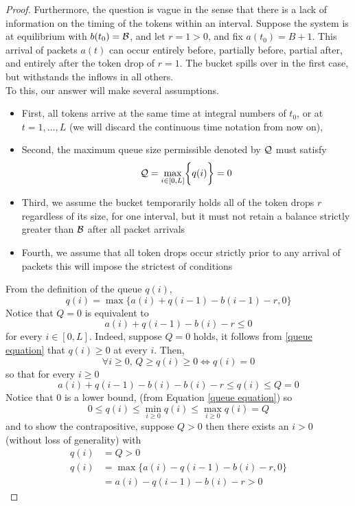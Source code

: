 \documentclass[../../main.tex]{subfiles}
\begin{document}
\begin{proof}
    Furthermore, the question is vague in the sense that there is a lack of information on the timing of the tokens within an interval. Suppose the system is at equilibrium with $b(t_0)=\mathcal{B}$, and let $r=1>0$, and fix $a(t_0)=B+1$. This arrival of packets $a(t)$ can occur entirely before, partially before, partial after, and entirely after the token drop of $r=1$. The bucket spills over in the first case, but withstands the inflows in all others.\\
    
    To this, our answer will make several assumptions.
    \begin{itemize}
        \item First, all tokens arrive at the same time at integral numbers of $t_0$, or at $t=1,\ldots, L$ (we will discard the continuous time notation from now on),
        \item Second, the maximum queue size permissible denoted by $\mathcal{Q}$ must satisfy
        \[\mathcal{Q} = \max_{i\in[0,L]}\biggl\{q(i)\biggr\}=0\]
        \item Third, we assume the bucket temporarily holds all of the token drops $r$ regardless of its size, for one interval, but it must not retain a balance strictly greater than $\mathcal{B}$ after all packet arrivals
        \item Fourth, we assume that all token drops occur strictly prior to any arrival of packets this will impose the strictest of conditions
    \end{itemize}
    From the definition of the queue $q(i)$,
    \begin{equation}\label{queue equation}
        q(i)=\max\biggl\{a(i)+q(i-1)-b(i-1)-r,0\biggr\}
    \end{equation}
    Notice that $Q=0$ is equivalent to \[a(i)+q(i-1)-b(i)-r\leq 0\]
    for every $i\in[0,L]$. Indeed, suppose $Q=0$ holds, it follows from \eqref{queue equation} that $q(i)\geq 0$ at every $i$. Then,
    \[\forall i\geq 0,\,Q\geq q(i)\geq 0\iff q(i)=0\]
    so that for every $i\geq 0$\[a(i)+q(i-1)-b(i)-b(i)-r\leq q(i)\leq Q=0\] Notice that $0$ is a lower bound, (from Equation \eqref{queue equation}) so
    \[0\leq q(i)\leq \min_{i\geq 0}q(i)\leq \max_{i\geq 0}q(i)=Q\]
    and to show the contrapositive, suppose $Q>0$ then there exists an $i>0$ (without loss of generality) with
    \begin{align*}
        q(i)&=Q>0\\ q(i)&=\max\{a(i)-q(i-1)-b(i)-r,0\}\\
        &=a(i)-q(i-1)-b(i)-r>0

\end{align*}
\end{proof}
\end{document}
